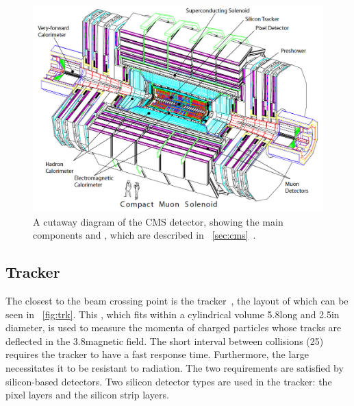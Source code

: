 
\begin{figure}[h]
\centering
\includegraphics[width=1.0\textwidth]{detectorFigures/cms-perspective.png}
\caption[A cutaway diagram of the CMS detector, showing the main components and \subdetector\s, which are described in \Sec \ref{sec:cms}\quad\cite{CMSTDR}.]{A cutaway diagram of the CMS detector, showing the main components and \subdetector\s, which are described in \Sec~\ref{sec:cms}~\cite{CMSTDR}.}
\label{fig:cms-exploded}
\end{figure}

\subsection{Tracker}
\label{sec:cms:tracker}

The closest \subdetector to the beam crossing point is the tracker~\cite{CMSTrackerTDR}, the layout of which can be seen in \Fig~\ref{fig:trk}. This \subdetector, which fits within a cylindrical volume 5.8\m long and 2.5\m in diameter, is used to measure the momenta of charged particles whose tracks are deflected in the 3.8\T magnetic field. 
The short interval between collisions (25\ns) requires the tracker to have a fast response time. Furthermore, the large \pp \crosssection necessitates it to be resistant to radiation. The two requirements are satisfied by silicon-based detectors. Two silicon detector types are used in the \CMS tracker: the pixel layers and the silicon strip layers.

